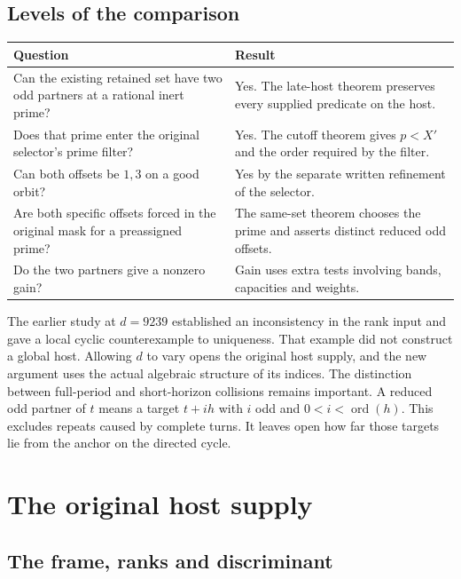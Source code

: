 \documentclass[12pt,letterpaper]{article}
\begin{document}
\subsection{Levels of the comparison}

\begin{center}
\begin{tabularx}{\linewidth}{@{}p{.34\linewidth}Y@{}}
\toprule
Question & Result\\
\midrule
Can the existing retained set have two odd partners at a rational inert prime? & Yes. The late-host theorem preserves every supplied predicate on the host.\\
Does that prime enter the original selector's prime filter? & Yes. The cutoff theorem gives \(p<X'\) and the order required by the filter.\\
Can both offsets be \(1,3\) on a good orbit? & Yes by the separate written refinement of the selector.\\
Are both specific offsets forced in the original mask for a preassigned prime? & The same-set theorem chooses the prime and asserts distinct reduced odd offsets.\\
Do the two partners give a nonzero gain? & Gain uses extra tests involving bands, capacities and weights.\\
\bottomrule
\end{tabularx}
\end{center}

The earlier study at \(d=9239\) established an inconsistency in the rank input and gave a local cyclic counterexample to uniqueness. That example did not construct a global host. Allowing \(d\) to vary opens the original host supply, and the new argument uses the actual algebraic structure of its indices. The distinction between full-period and short-horizon collisions remains important. A reduced odd partner of \(t\) means a target \(t+ih\) with \(i\) odd and \(0<i<\operatorname{ord}(h)\). This excludes repeats caused by complete turns. It leaves open how far those targets lie from the anchor on the directed cycle.

\section{The original host supply}
\label{sec:host}

\subsection{The frame, ranks and discriminant}
\end{document}
